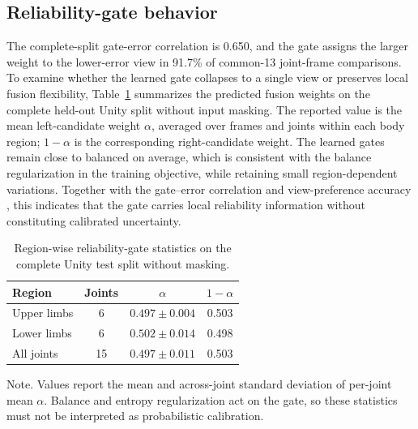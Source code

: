 \documentclass[preprint,12pt]{elsarticle}
\renewcommand{\textit}[1]{\textup{#1}}
\providecommand{\DIFaddbegin}{} %
\providecommand{\DIFaddend}{} %
\providecommand{\DIFadd}[1]{{\protect\color{blue}#1}} %
\begin{document}

\DIFaddbegin \FloatBarrier
\subsection{\DIFadd{Reliability-gate behavior}}

\DIFadd{The complete-split gate-error correlation is 0.650, and the gate assigns the larger weight to the lower-error view in 91.7\% of common-13 joint-frame comparisons. }\DIFaddend To examine whether the learned gate collapses to a single view or preserves local fusion flexibility, Table~\ref{tab:gate_region_summary} summarizes the predicted fusion weights on the complete held-out Unity split without input masking. The reported value is the mean left-candidate weight \(\alpha\), averaged over frames and joints within each body region; \(1-\alpha\) is the corresponding right-candidate weight. The learned gates remain close to balanced on average, which is consistent with the balance regularization in the training objective, while retaining small region-dependent variations. Together with the  gate--error correlation and  view-preference accuracy , this indicates that the gate carries local reliability information without constituting calibrated uncertainty.

\begin{table}[t]
\centering
\caption{Region-wise reliability-gate statistics on the complete Unity test split without masking.}
\label{tab:gate_region_summary}
\footnotesize
\setlength{\tabcolsep}{6pt}
\renewcommand{\arraystretch}{1.08}
\begin{tabular}{lccc}
\toprule
Region & Joints & \(\alpha\) & \(1-\alpha\) \\
\midrule
Upper limbs & 6 & \(0.497 \pm 0.004\) & 0.503 \\
Lower limbs & 6 & \(0.502 \pm 0.014\) & 0.498 \\
All joints & 15 & \(0.497 \pm 0.011\) & 0.503 \\
\bottomrule
\end{tabular}
\vspace{0.4em}
\begin{minipage}{0.94\linewidth}
\footnotesize
\textit{Note.} Values report the mean and across-joint standard deviation of per-joint mean \(\alpha\). Balance and entropy regularization act on the gate, so these statistics must not be interpreted as probabilistic calibration.
\end{minipage}
\end{table}
\end{document}
